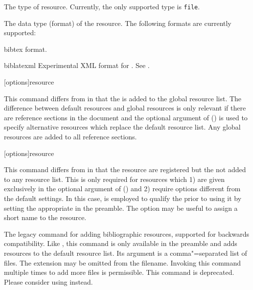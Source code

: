 \documentclass{ltxdockit}[2011/03/25]
\newcommand*{\biblatex}{\sty{biblatex}\xspace}
\begin{document}
\begin{ltxsyntax}
\begin{optionlist*}
The type of resource. Currently, the only supported type is \texttt{file}.


The data type (format) of the resource. The following formats are currently supported:

\begin{valuelist}

\item[bibtex] \bibtex format.

\item[biblatexml]  Experimental XML format for \biblatex. See .

\end{valuelist}

\end{optionlist*}

[options]{resource}

This command differs from  in that the  is added to the global resource list. The difference between default resources and global resources is only relevant if there are reference sections in the document and the optional argument of  () is used to specify alternative resources which replace the default resource list. Any global resources are added to all reference sections.

[options]{resource}

This command differs from  in that the resource  are registered but the  not added to any resource list. This is only required for resources which 1) are given exclusively in the optional argument of  () and 2) require options different from the default settings. In this case,  is employed to qualify the  prior to using it by setting the appropriate  in the preamble. The  option may be useful to assign a short name to the resource.

\DeprecatedMark

The legacy command for adding bibliographic resources, supported for backwards compatibility. Like , this command is only available in the preamble and adds resources to the default resource list. Its argument is a comma"=separated list of  files. The  extension may be omitted from the filename. Invoking this command multiple times to add more files is permissible. This command is deprecated. Please consider using  instead.


\end{ltxsyntax}
\end{document}
